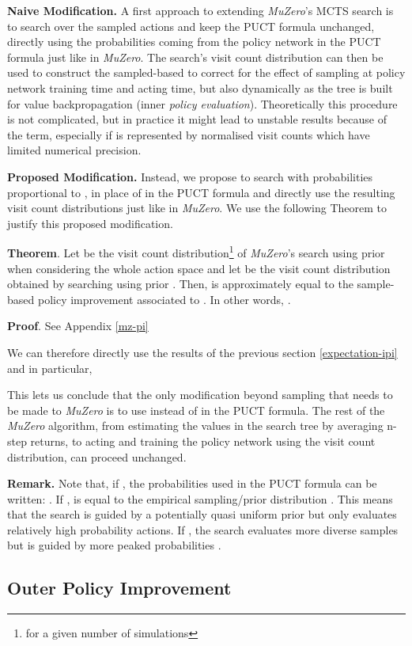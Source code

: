 \documentclass{article}
\newcommand{\muzero}{\emph{MuZero}}
\begin{document}
\textbf{Naive Modification.}
A first approach to extending \muzero{}'s MCTS search is to search over the sampled actions  and keep the PUCT formula unchanged, directly using the probabilities  coming from the policy network in the PUCT formula just like in \muzero{}. The search's visit count distribution  can then be used to construct the sampled-based  to correct for the effect of sampling at policy network training time and acting time, but also dynamically as the tree is built for value backpropagation (inner \emph{policy evaluation}). Theoretically this procedure is not complicated, but in practice it might lead to unstable results because of the  term, especially if  is represented by normalised visit counts which have limited numerical precision.

\textbf{Proposed Modification.}
Instead, we propose to search with probabilities  proportional to , in place of  in the PUCT formula and directly use the resulting visit count distributions just like in \muzero{}. We use the following Theorem to justify this proposed modification.

\textbf{Theorem}.
Let  be the visit count distribution\footnote{for a given number of simulations} of \muzero{}'s search using prior  when considering the whole action space  and let  be the visit count distribution obtained by searching using prior . Then,  is approximately equal to the sample-based policy improvement associated to . In other words, .

\textbf{Proof}. See Appendix \ref{mz-pi}

We can therefore directly use the results of the previous section \ref{expectation-ipi} and in particular,

This lets us conclude that the only modification beyond sampling that needs to be made to \muzero{} is to use  instead of  in the PUCT formula. The rest of the \muzero{} algorithm, from estimating the values in the search tree by averaging n-step returns, to acting and training the policy network using the visit count distribution, can proceed unchanged.

\textbf{Remark.} Note that, if , the probabilities  used in the PUCT formula can be written: . If ,  is equal to the empirical sampling/prior distribution . This means that the search is guided by a potentially quasi uniform prior  but only evaluates relatively high probability actions. If , the search evaluates more diverse samples but is guided by more peaked probabilities .

\subsection{Outer Policy Improvement}
\end{document}
